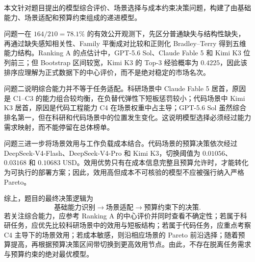 本文针对题目提出的模型综合评价、场景选择与成本约束决策问题，构建了由基础能力、场景适配和预算约束组成的递进模型。

问题一在 \(164/210=78.1\%\) 的有效公开观测下，先区分普通缺失与结构性缺失，再通过缺失感知相关性、Family 平衡成对比较和正则化 Bradley--Terry 得到五维能力结构。Ranking A 的点估计中，GPT-5.6 Sol、Claude Fable 5 和 Kimi K3 位列前三；但 Bootstrap 区间较宽，Kimi K3 的 Top-3 经验概率为 \(0.4225\)，因此该排序应理解为正式数据下的中心评价，而不是绝对稳定的市场名次。

问题二说明综合能力并不等于任务适配。科研场景中 Claude Fable 5 居首，原因是 C1--C3 的能力组合较均衡，在负替代弹性下短板惩罚较小；代码场景中 Kimi K3 居首，原因是代码工程能力 C4 在场景权重中占主导；GPT-5.6 Sol 虽然综合排名第一，但在科研和代码场景中的位置发生变化。这说明模型选择必须经过能力需求映射，而不能停留在总体榜单。

问题三进一步将场景效用与工作负载成本结合。代码场景的预算决策依次经过 DeepSeek-V4-Flash、DeepSeek-V4-Pro 和 Kimi K3，切换阈值为 \(0.01056\)、\(0.03168\) 和 \(0.10683\) USD。效用优势只有在成本信息完整且预算允许时，才能转化为可执行的部署方案；因此，效用高但成本不可核验的模型不应被强行纳入严格 Pareto。

综上，题目的最终决策逻辑为
\[
\boxed{
\text{基础能力识别}
\longrightarrow
\text{场景适配}
\longrightarrow
\text{预算约束下的决策}
}.
\]
若关注综合能力，应参考 Ranking A 的中心评价并同时查看不确定性；若属于科研任务，应优先比较科研场景中的效用与短板结构；若属于代码任务，应重点考察 C4 主导下的场景效用；若成本敏感，则沿相应场景的 Pareto 前沿选择；随着预算提高，再根据预算决策区间带切换到更高效用节点。由此，不存在脱离任务需求与预算约束的绝对最优模型。
